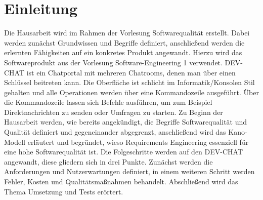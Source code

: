 \section{Einleitung}
Die Hausarbeit wird im Rahmen der Vorlesung Softwarequalität erstellt.
Dabei werden zunächst Grundwissen und Begriffe definiert, anschließend werden die erlernten Fähigkeiten auf ein konkretes Produkt angewandt.
Hierzu wird das Softwareprodukt  aus der Vorlesung Software-Engineering 1 verwendet.
\newparagraph
DEV-CHAT ist ein Chatportal mit mehreren Chatrooms, denen man über einen Schlüssel beitreten kann.
Die Oberfläche ist schlicht im Informatik/Konsolen Stil gehalten und alle Operationen werden über eine Kommandozeile ausgeführt.
Über die Kommandozeile lassen sich Befehle ausführen, um zum Beispiel Direktnachrichten zu senden oder Umfragen zu starten.
\newparagraph
Zu Beginn der Hausarbeit werden, wie bereits angekündigt, die Begriffe Softwarequalität und Qualität definiert und gegeneinander abgegrenzt, anschließend wird das Kano-Modell erläutert und begründet, wieso Requirements Engineering essenziell für eine hohe Softwarequalität ist.
Die Folgeschritte werden auf den DEV-CHAT angewandt, diese gliedern sich in drei Punkte.
Zunächst werden die Anforderungen und Nutzerwartungen definiert, in einem weiteren Schritt werden Fehler, Kosten und Qualitätsmaßnahmen behandelt.
Abschließend wird das Thema Umsetzung und Tests erörtert.